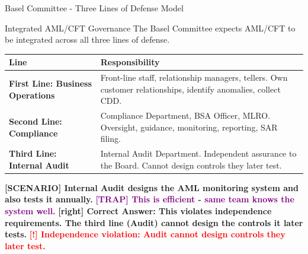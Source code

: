 \documentclass[11pt,a4paper]{beamer}
\newcommand{\redflag}[1]{\textcolor{red}{\textbf{[!] #1}}}
\newcommand{\trap}[1]{\textcolor{purple}{\textbf{[TRAP] #1}}}
\newcommand{\correct}[1]{\textcolor{green!50!black}{\textbf{[right] #1}}}
\newcommand{\scenario}[1]{\textcolor{blue!70!black}{\textbf{[SCENARIO] #1}}}
\begin{document}
\begin{frame}{Basel Committee - Three Lines of Defense Model}
\begin{block}{Integrated AML/CFT Governance}
The Basel Committee expects AML/CFT to be integrated across all three lines of defense.
\end{block}
\begin{tabular}{p{}|p{}}
\hline
\rowcolor{lightgray}
\textbf{Line} & \textbf{Responsibility} \\
\hline
\textbf{First Line: Business Operations} & Front-line staff, relationship managers, tellers. Own customer relationships, identify anomalies, collect CDD. \\
\hline
\textbf{Second Line: Compliance} & Compliance Department, BSA Officer, MLRO. Oversight, guidance, monitoring, reporting, SAR filing. \\
\hline
\textbf{Third Line: Internal Audit} & Internal Audit Department. Independent assurance to the Board. Cannot design controls they later test. \\
\hline
\end{tabular}
\scenario{Internal Audit designs the AML monitoring system and also tests it annually.}
\trap{This is efficient - same team knows the system well.}
\correct{Correct Answer: This violates independence requirements. The third line (Audit) cannot design the controls it later tests.}
\redflag{Independence violation: Audit cannot design controls they later test.}
\end{frame}

\end{document}
